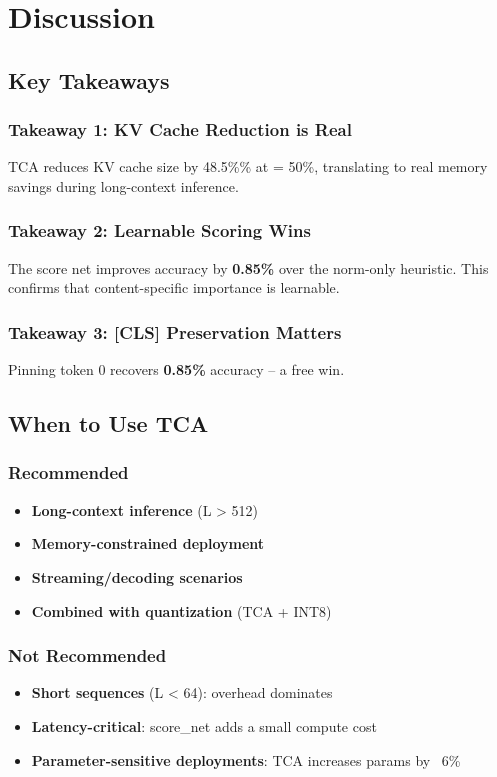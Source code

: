 \section{Discussion}

\subsection{Key Takeaways}

\subsubsection{Takeaway 1: KV Cache Reduction is Real}

TCA reduces KV cache size by 48.5\%\% at   = 50\%, translating 
to real memory savings during long-context inference.

\subsubsection{Takeaway 2: Learnable Scoring Wins}

The score net improves accuracy by \textbf{0.85\%} over the norm-only 
heuristic. This confirms that content-specific importance is learnable.

\subsubsection{Takeaway 3: [CLS] Preservation Matters}

Pinning token 0 recovers \textbf{0.85\%} accuracy -- a free win.

\subsection{When to Use TCA}

\subsubsection{Recommended}
\begin{itemize}
\item \textbf{Long-context inference} (L > 512)
\item \textbf{Memory-constrained deployment}
\item \textbf{Streaming/decoding scenarios}
\item \textbf{Combined with quantization} (TCA + INT8)

\end{itemize}
\subsubsection{Not Recommended}
\begin{itemize}
\item \textbf{Short sequences} (L < 64): overhead dominates
\item \textbf{Latency-critical}: score\_net adds a small compute cost
\item \textbf{Parameter-sensitive deployments}: TCA increases params by ~6\%

\end{itemize}
